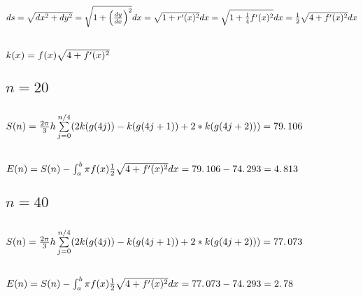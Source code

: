 \documentclass{article}
\begin{document}
\subsection{$ds=\protect\sqrt{dx^{2}+dy^{2}}=\protect\sqrt{1+\left( \frac{dy%
}{dx}\right) ^{2}}dx=\protect\sqrt{1+r^{\prime }(x)^{2}}dx=\protect\sqrt{1+%
\frac{1}{4}f^{\prime }(x)^{2}}dx=\frac{1}{2}\protect\sqrt{4+f^{\prime
}(x)^{2}}dx$}

\subsection{$k(x)=f(x)\protect\sqrt{4+f^{\prime }(x)^{2}}$}

\bigskip

\bigskip

\subsection{$n=20$}

\subsection{$S(n)=\frac{2\protect\pi }{3}h\sum%
\limits_{j=0}^{n/4}(2k(g(4j))-k(g(4j+1))+2\ast k(g(4j+2)))=79.\,\allowbreak
106\allowbreak $}

\subsection{$E(n)=S(n)-\protect\int_{a}^{b}\protect\pi f(x)\frac{1}{2}%
\protect\sqrt{4+f^{\prime }(x)^{2}}dx=79.\,\allowbreak 106\allowbreak
-\allowbreak \allowbreak 74.\,\allowbreak 293=\allowbreak 4.\,\allowbreak
813 $}

\bigskip

\subsection{$n=40$}

\subsection{$S(n)=\frac{2\protect\pi }{3}h\sum%
\limits_{j=0}^{n/4}(2k(g(4j))-k(g(4j+1))+2\ast k(g(4j+2)))=\allowbreak
77.\,\allowbreak 073$}

\subsection{$E(n)=S(n)-\protect\int_{a}^{b}\protect\pi f(x)\frac{1}{2}%
\protect\sqrt{4+f^{\prime }(x)^{2}}dx=\allowbreak 77.\,\allowbreak
073\allowbreak -\allowbreak \allowbreak 74.\,\allowbreak 293=\allowbreak
2.\,\allowbreak 78$}
\end{document}
